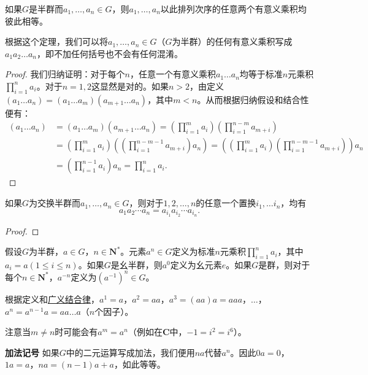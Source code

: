 \documentclass[../../main.tex]{subfiles}
\begin{document}
\begin{theorem}[广义结合律]\label{theorem:广义结合律}
如果$G$是半群而$a_1, \dots, a_n \in G$，则$a_1, \dots, a_n$以此排列次序的任意两个有意义乘积均彼此相等。
\end{theorem}
\begin{remark}
根据这个定理，我们可以将$a_1, \dots, a_n \in G$（$G$为半群）的任何有意义乘积写成$a_1 a_2 \dots a_n$，即不加任何括号也不会有任何混淆。
\end{remark}
\begin{proof}
我们归纳证明：对于每个$n$，任意一个有意义乘积$a_1 \dots a_n$均等于标准$n$元乘积$\prod_{i = 1}^n a_i$。对于$n = 1, 2$这显然是对的。如果$n > 2$，由定义$(a_1 \dots a_n) = (a_1 \dots a_m)(a_{m + 1} \dots a_n)$，其中$m < n$。从而根据归纳假设和结合性便有：
\begin{align*}
(a_1 \dots a_n) &= (a_1 \dots a_m)(a_{m + 1} \dots a_n) = \left( \prod_{i = 1}^m a_i \right) \left( \prod_{i = 1}^{n - m} a_{m + i} \right) \\
&= \left( \prod_{i = 1}^m a_i \right) \left( \left( \prod_{i = 1}^{n - m - 1} a_{m + i} \right) a_n \right) = \left( \left( \prod_{i = 1}^m a_i \right) \left( \prod_{i = 1}^{n - m - 1} a_{m + i} \right) \right) a_n \\
&= \left( \prod_{i = 1}^{n - 1} a_i \right) a_n = \prod_{i = 1}^n a_i.
\end{align*}
\end{proof}

\begin{theorem}[广义交换律]\label{theorem:广义交换律}
如果$G$为交换半群而$a_1, \dots, a_n \in G$，则对于$1, 2, \dots, n$的任意一个置换$i_1, \dots i_n$，均有
\[a_{1}a_{2}\cdots a_{n} = a_{i_1}a_{i_2}\cdots a_{i_n}.\]
\end{theorem}
\begin{proof}

\end{proof}

\begin{definition}[方幂]
假设$G$为半群，$a \in G$，$n \in \boldsymbol{N}^*$。元素$a^n \in G$定义为标准$n$元乘积$\prod_{i = 1}^n a_i$，其中$a_i = a(1 \leqslant i \leqslant n)$。如果$G$是幺半群，则$a^0$定义为幺元素$e$。如果$G$是群，则对于每个$n \in \boldsymbol{N}^*$，$a^{-n}$定义为$(a^{-1})^n \in G$。
\end{definition}
\begin{remark}
根据定义和\hyperref[theorem:广义结合律]{广义结合律}，$a^1 = a$，$a^2 = aa$，$a^3 = (aa)a = aaa$，$\dots$，$a^n = a^{n - 1}a = aa \dots a$（$n$个因子）。

注意当$m \neq n$时可能会有$a^m = a^n$（例如在$\boldsymbol{C}$中，$-1 = i^2 = i^6$）。

\textbf{加法记号}$\,\,$如果$G$中的二元运算写成加法，我们便用$na$代替$a^n$。因此$0a = 0$，$1a = a$，$na = (n - 1)a + a$，如此等等。
\end{remark}
\end{document}
